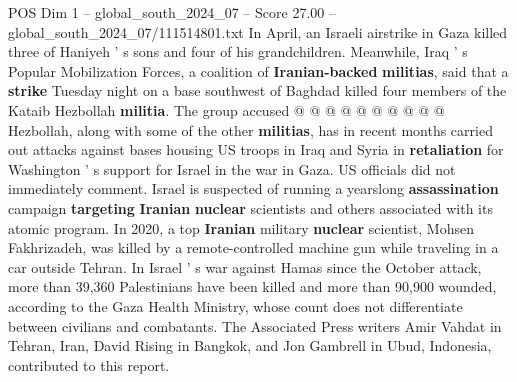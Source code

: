 \begin{textsample}{POS Dim 1 – global\_south\_2024\_07 – Score 27.00 – global\_south\_2024\_07/111514801.txt}
In April, an Israeli airstrike in Gaza killed three of Haniyeh ' s sons and four of his grandchildren.
Meanwhile, Iraq ' s Popular Mobilization Forces, a coalition of \textbf{Iranian-backed} \textbf{militias}, said that a \textbf{strike} Tuesday night on a base southwest of Baghdad killed four members of the Kataib Hezbollah \textbf{militia}.
The group accused @ @ @ @ @ @ @ @ @ @ Hezbollah, along with some of the other \textbf{militias}, has in recent months carried out attacks against bases housing US troops in Iraq and Syria in \textbf{retaliation} for Washington ' s support for Israel in the war in Gaza.
US officials did not immediately comment.
Israel is suspected of running a yearslong \textbf{assassination} campaign \textbf{targeting} \textbf{Iranian} \textbf{nuclear} scientists and others associated with its atomic program.
In 2020, a top \textbf{Iranian} military \textbf{nuclear} scientist, Mohsen Fakhrizadeh, was killed by a remote-controlled machine gun while traveling in a car outside Tehran.
In Israel ' s war against Hamas since the October attack, more than 39,360 Palestinians have been killed and more than 90,900 wounded, according to the Gaza Health Ministry, whose count does not differentiate between civilians and combatants.
The Associated Press writers Amir Vahdat in Tehran, Iran, David Rising in Bangkok, and Jon Gambrell in Ubud, Indonesia, contributed to this report.

\end{textsample}
